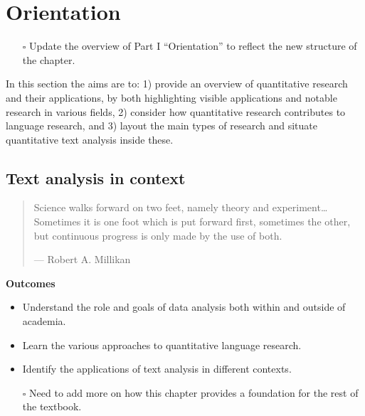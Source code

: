 \documentclass[
  letterpaper,
]{latex/krantz}
\providecommand{\tightlist}{%
  \setlength{\itemsep}{0pt}\setlength{\parskip}{0pt}}\usepackage{longtable,booktabs,array}
\begin{document}
\part{Orientation}

\begin{itemize}
\tightlist
\item[$\square$]
  Update the overview of Part I ``Orientation'' to reflect the new
  structure of the chapter.
\end{itemize}

In this section the aims are to: 1) provide an overview of quantitative
research and their applications, by both highlighting visible
applications and notable research in various fields, 2) consider how
quantitative research contributes to language research, and 3) layout
the main types of research and situate quantitative text analysis inside
these.

\hypertarget{sec-text-analysis-in-context}{%
\chapter{Text analysis in context}\label{sec-text-analysis-in-context}}

\begin{quote}
Science walks forward on two feet, namely theory and
experiment\ldots Sometimes it is one foot which is put forward first,
sometimes the other, but continuous progress is only made by the use of
both.

--- Robert A. Millikan
\end{quote}

\begin{tcolorbox}[enhanced jigsaw, left=2mm, arc=.35mm, colback=white, rightrule=.15mm, toprule=.15mm, breakable, leftrule=.75mm, opacityback=0, bottomrule=.15mm]

\textbf{ Outcomes}

\begin{itemize}
\tightlist
\item
  Understand the role and goals of data analysis both within and outside
  of academia.
\item
  Learn the various approaches to quantitative language research.
\item
  Identify the applications of text analysis in different contexts.
\end{itemize}

\end{tcolorbox}

\begin{itemize}
\tightlist
\item[$\square$]
  Need to add more on how this chapter provides a foundation for the
  rest of the textbook.
\end{itemize}
\end{document}
